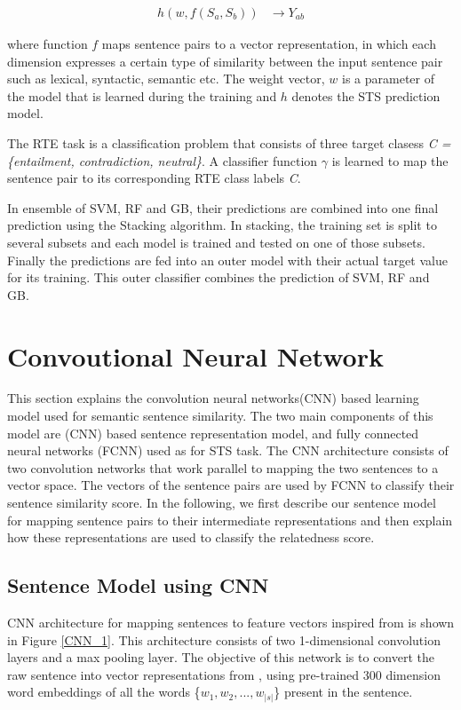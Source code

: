 \documentclass[12pt]{report} %
\begin{document}
	\begin{align} 
	h(w,f(S_a,S_b))  & \rightarrow Y_{ab} 
	\end{align}
	
	where function $f$ maps sentence pairs to a vector
	representation, in which each dimension expresses a certain type of
	similarity between the input sentence pair such as lexical, syntactic, semantic etc. The weight vector,
	$w$ is a parameter of the model that is learned during the training and $h$ denotes the STS prediction model.
	
	The RTE task is a classification problem that consists of three target clasess  \textit{ C =\{entailment, contradiction, neutral\}}. A classifier function $\gamma$ is learned to map the sentence pair to its corresponding RTE class labels \textit{C}.
	
	In ensemble of SVM, RF and GB, their predictions are combined into one final prediction using the Stacking algorithm. In stacking, the training set is split to several subsets and each model is trained and tested on one of those subsets. Finally the predictions are fed into an outer model with their actual target value for its training. This outer classifier combines the prediction of SVM, RF and GB.
	
	
\section{Convoutional Neural Network}
	This section explains the convolution neural networks(CNN) based learning model used for semantic sentence similarity. The two main components of this model are (CNN) based sentence representation model, and fully connected neural networks (FCNN) used as for STS task. The CNN architecture consists of two convolution networks that work parallel to mapping the two sentences to a vector space. The vectors of the sentence pairs are used by FCNN to classify their sentence similarity score. In the following, we first describe our sentence model for mapping sentence pairs to their intermediate representations and then explain how these representations are used to classify the relatedness score.
	
	\subsection{Sentence Model using CNN}
	CNN architecture for mapping sentences to feature
	vectors inspired from \cite{shao2017hcti} is shown in Figure \ref{CNN_1}. This architecture consists of two 1-dimensional convolution layers and a max pooling layer. The objective of this network is to convert the raw sentence into vector representations from \cite{pennington2014glove}, using pre-trained 300 dimension word embeddings of all the words \{$w_{1}, w_{2},...,w_{|s|}$\} present in the sentence.
	
\end{document}
